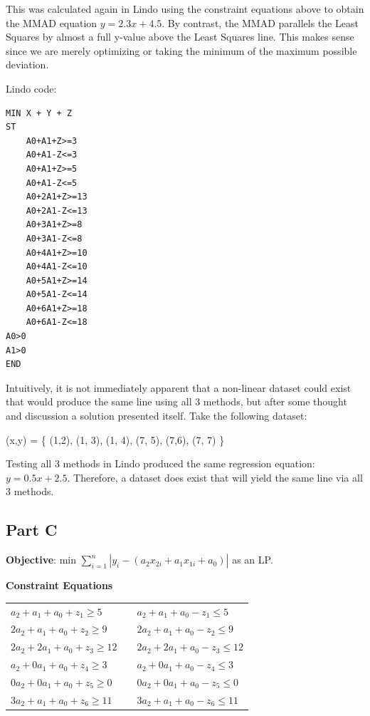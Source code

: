 \documentclass[11pt,letterpaper]{article}
\begin{document}
This was calculated again in Lindo using the constraint equations above to obtain the MMAD equation $y = 2.3x + 4.5$. By contrast, the MMAD parallels the Least Squares by almost a full y-value above the Least Squares line. This makes sense since we are merely optimizing or taking the minimum of the maximum possible deviation.\vspace{8pt}

Lindo code:\vspace{8pt}

\begin{verbatim}
MIN X + Y + Z
ST
    A0+A1+Z>=3
    A0+A1-Z<=3
    A0+A1+Z>=5
    A0+A1-Z<=5
    A0+2A1+Z>=13
    A0+2A1-Z<=13
    A0+3A1+Z>=8
    A0+3A1-Z<=8
    A0+4A1+Z>=10
    A0+4A1-Z<=10
    A0+5A1+Z>=14
    A0+5A1-Z<=14
    A0+6A1+Z>=18
    A0+6A1-Z<=18
A0>0
A1>0
END
\end{verbatim}

Intuitively, it is not immediately apparent that a non-linear dataset could exist that would produce the same line using all 3 methods, but after some thought and discussion a solution presented itself. Take the following dataset:\vspace{8pt}

\hspace{20pt}(x,y) = \{ (1,2), (1, 3), (1, 4), (7, 5), (7,6), (7, 7) \}\vspace{8pt}

Testing all 3 methods in Lindo produced the same regression equation: $y = 0.5x + 2.5$. Therefore, a dataset does exist that will yield the same line via all 3 methods.


\subsection*{Part C}
\textbf{Objective}: min $\sum\limits_{i=1}^n |y_i -  (a_2x_{2i} + a_1x_{1i} + a_0)|$ as an LP.\vspace{8pt}

\textbf{Constraint Equations}

\begin{tabular}{l l l}
$a_2 + a_1 + a_0 + z_1 \geq 5$ & & $a_2 + a_1 + a_0 - z_1 \leq 5$\\
$2a_2 + a_1 + a_0 + z_2 \geq 9$ & & $2a_2 + a_1 + a_0 - z_2 \leq 9$\\
$2a_2 + 2a_1 + a_0 + z_3 \geq 12$ & & $2a_2 + 2a_1 + a_0 - z_3 \leq 12$\\
$a_2 + 0a_1 + a_0 + z_4 \geq 3$ & & $a_2 + 0a_1 + a_0 - z_4 \leq 3$\\
$0a_2 + 0a_1 + a_0 + z_5 \geq 0$ & & $0a_2 + 0a_1 + a_0 - z_5 \leq 0$\\
$3a_2 + a_1 + a_0 + z_6 \geq 11$ & & $3a_2 + a_1 + a_0 - z_6 \leq 11$\\
\end{tabular}\vspace{8pt}
\end{document}
